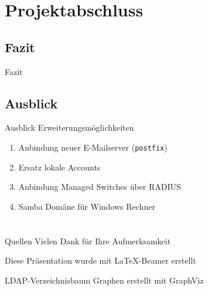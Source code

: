 \documentclass[handout,svgnames]{beamer}
\begin{document}
\section{Projektabschluss}
\subsection{Fazit}
\begin{frame}{Fazit}

\end{frame}


\subsection{Ausblick}
\begin{frame}{Ausblick}
	Erweiterungsmöglichkeiten
	\begin{enumerate}
		\item Anbindung neuer E-Mailserver (\texttt{postfix})
		\item Ersatz lokale Accounts
		\item Anbindung Managed Switches über RADIUS
		\item Samba Domäne für Windows Rechner
	\end{enumerate}
\end{frame}

\section{}%
\begin{frame}{Quellen}
	Vielen Dank für Ihre Aufmerksamkeit
	
	\medskip
	\medskip Diese Präsentation wurde mit \LaTeX{}-Beamer erstellt
	
	LDAP-Verzeichnisbaum Graphen erstellt mit GraphViz
\end{frame}
\end{document}
